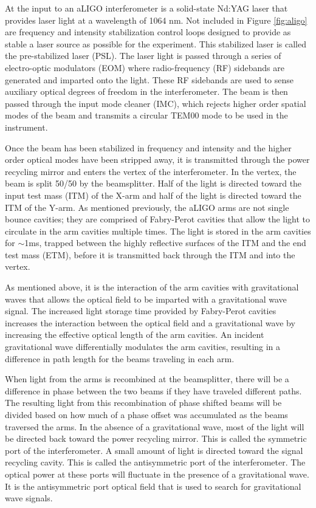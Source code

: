 At the input to an aLIGO interferometer is a solid-state Nd:YAG laser that provides laser light 
at a wavelength of 1064 nm. Not included in Figure \ref{fig:aligo} are frequency and 
intensity stabilization control loops designed to provide as stable a laser source as 
possible for the experiment. This stabilized laser is called the pre-stabilized laser 
(PSL). The laser light is passed through a series of 
electro-optic modulators (EOM) where radio-frequency (RF) sidebands are generated 
and imparted onto the light. These RF sidebands are used to sense auxiliary optical 
degrees of freedom in the interferometer. The beam is then passed through the 
input mode cleaner (IMC), which rejects higher order spatial modes of the beam 
and transmits a circular TEM00 mode to be used in the instrument.

Once the beam has been stabilized in frequency and intensity and the higher order 
optical modes have been stripped away, it is transmitted through the power 
recycling mirror and enters the vertex of the interferometer. In the vertex, 
the beam is split 50/50 by the beamsplitter. Half of the light is directed toward  
the input test mass (ITM) of the X-arm and half of the light is directed  
toward the ITM of the Y-arm. As mentioned previously, the aLIGO arms are not 
single bounce cavities; they are comprised of Fabry-Perot cavities that allow the 
light to circulate in the arm cavities multiple times. The light is stored in 
the arm cavities for $\sim$1ms, trapped between the highly reflective surfaces 
of the ITM and the end test mass (ETM), before it is transmitted back through 
the ITM and into the vertex.

As mentioned above, it is the interaction of the arm cavities with gravitational 
waves that allows the optical field to be imparted with a gravitational wave signal. 
The increased light storage time provided by Fabry-Perot cavities increases the 
interaction between the optical field and a gravitational wave by increasing 
the effective optical length of the arm cavities. 
An incident gravitational wave differentially modulates the arm cavities, resulting 
in a difference in path length for the beams traveling in each arm.  

When light
from the arms is recombined at the beamsplitter, there will be a difference
in phase between the two beams if they have traveled different paths. The 
resulting light from this recombination of phase shifted beams will 
be divided based on how much of a phase offset was accumulated as the 
beams traversed the arms. In the absence of a gravitational wave, most of the 
light will be directed back toward the power recycling mirror. This is called 
the symmetric port of the interferometer. A small amount of light is directed 
toward the signal recycling cavity. This is called the antisymmetric port of 
the interferometer. The optical power at these ports will fluctuate in the 
presence of a gravitational wave. It is the antisymmetric port optical field 
that is used to search for gravitational wave signals.

